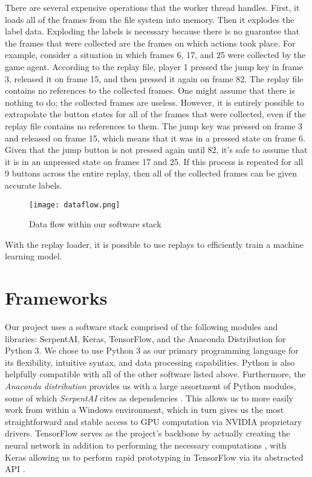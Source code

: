 There are several expensive operations that the worker thread handles. First, it loads all of the frames from the file system into memory. Then it explodes the label data. Exploding the labels is necessary because there is no guarantee that the frames that were collected are the frames on which actions took place. For example, consider a situation in which frames 6, 17, and 25 were collected by the game agent. According to the replay file, player 1 pressed the jump key in frame 3, released it on frame 15, and then pressed it again on frame 82. The replay file contains no references to the collected frames. One might assume that there is nothing to do; the collected frames are useless. However, it is entirely possible to extrapolate the button states for all of the frames that were collected, even if the replay file contains no references to them. The jump key was pressed on frame 3 and released on frame 15, which means that it was in a pressed state on frame 6. Given that the jump button is not pressed again until 82, it's safe to assume that it is in an unpressed state on frames 17 and 25. If this process is repeated for all 9 buttons across the entire replay, then all of the collected frames can be given accurate labels.

\begin{figure}
	\caption{Data flow within our software stack}
	\centering
		\texttt{[image: dataflow.png]} \\
\end{figure}

With the replay loader, it is possible to use replays to efficiently train a machine learning model.


\section{Frameworks}

Our project uses a software stack comprised of the following modules and libraries: SerpentAI, Keras, TensorFlow, and the Anaconda Distribution for Python 3. We chose to use Python 3 as our primary programming language for its flexibility, intuitive syntax, and data processing capabilities. Python is also helpfully compatible with all of the other software listed above. Furthermore, the {\it Anaconda distribution} provides us with a large assortment of Python modules, some of which {\it SerpentAI} cites as dependencies \cite{SerpentAI}. This allows us to more easily work from within a Windows environment, which in turn gives us the most straightforward and stable access to GPU computation via NVIDIA proprietary drivers. TensorFlow serves as the project's backbone by actually creating the neural network in addition to performing the necessary computations \cite{TensorFlow}, with Keras allowing us to perform rapid prototyping in TensorFlow via its abstracted API \cite{Keras}.

